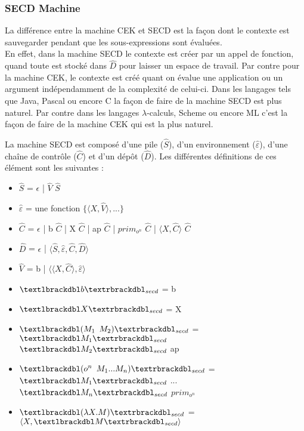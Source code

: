 \documentclass[10pt,a4paper]{article}
\begin{document}
			
			\subsubsection{SECD Machine}
			
				La différence entre la machine CEK et SECD est la façon dont le contexte est sauvegarder pendant que les sous-expressions sont évaluées.\\
				En effet, dans la machine SECD le contexte est créer par un appel de fonction, quand toute est stocké dans $\widehat{D}$ pour laisser un espace de travail. Par contre pour la machine CEK, le contexte est créé quant on évalue une application ou un argument indépendamment de la complexité de celui-ci.
				\smallbreak 
				Dans les langages tels que Java, Pascal ou encore C la façon de faire de la machine SECD est plus naturel. Par contre  dans les langages $\lambda$-calculs, Scheme ou encore ML c'est la façon de faire de la machine CEK qui est la plus naturel.
				\medbreak
				
				La machine SECD est composé d'une pile ($\widehat{S}$), d'un environnement ($\widehat{\varepsilon}$), d'une chaîne de contrôle ($\widehat{C}$) et d'un dépôt ($\widehat{D}$). Les différentes définitions de ces élément sont les suivantes :
				\smallbreak
				\begin{itemize}
					\item[] $\widehat{S}$ = $\epsilon$ | $\widehat{V}$ $\widehat{S}$ 
					\item[] $\widehat{\varepsilon}$ = une fonction $\{\langle X,\widehat{V}\rangle,...\}$
					\item[] $\widehat{C}$ = $\epsilon$ | b $\widehat{C}$ | X $\widehat{C}$ | ap $\widehat{C}$ | $prim_{o^{n}}$ $\widehat{C}$ | $\langle X,\widehat{C}\rangle$ $\widehat{C}$
					\item[] $\widehat{D}$ = $\epsilon$ | $\langle\widehat{S},\widehat{\varepsilon},\widehat{C},\widehat{D}\rangle$
					\item[] $\widehat{V}$ = b | $\langle\langle X,\widehat{C}\rangle,\widehat{\varepsilon}\rangle$
					\item[] $\textlbrackdbl b\textrbrackdbl _{secd}$ = b
					\item[] $\textlbrackdbl X\textrbrackdbl _{secd}$ = X
					\item[] $\textlbrackdbl (M_{1}$ $M_{2})\textrbrackdbl _{secd}$ = $\textlbrackdbl M_{1}\textrbrackdbl _{secd}$ $\textlbrackdbl M_{2}\textrbrackdbl _{secd}$ ap
					\item[] $\textlbrackdbl (o^{n}$ $M_{1}...M_{n})\textrbrackdbl _{secd}$ = $\textlbrackdbl M_{1}\textrbrackdbl _{secd}$ $...$ $\textlbrackdbl M_{n}\textrbrackdbl _{secd}$ $prim_{o^{n}}$
					\item[]  $\textlbrackdbl(\lambda X.M)\textrbrackdbl _{secd}$ =  $\langle X,\textlbrackdbl M\textrbrackdbl _{secd}\rangle$
				\end{itemize}
				\bigbreak
				
\end{document}

